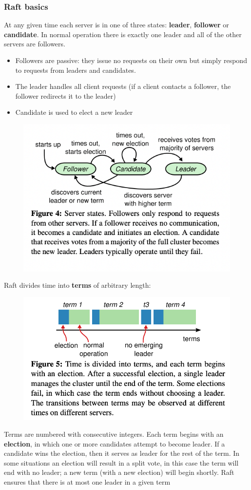 \documentclass[11pt]{article}
\begin{document}
\subsubsection{Raft basics}
\label{sec:org1157358}
At any given time each server is in one of three states: \textbf{leader}, \textbf{follower} or \textbf{candidate}. In
normal operation there is exactly one leader and all of the other servers are followers.
\begin{itemize}
\item Followers are passive: they issue no requests on their own but simply respond to requests from
leaders and candidates.
\item The leader handles all client requests (if a client contacts a follower, the follower
redirects it to the leader)
\item Candidate is used to elect a new leader
\end{itemize}
\begin{figure}[htbp]
\centering
\includegraphics[width=.7\textwidth]{../images/6.824/4.png}
\label{}
\end{figure}

Raft divides time into \textbf{terms} of arbitrary length:
\begin{figure}[htbp]
\centering
\includegraphics[width=.7\textwidth]{../images/6.824/5.png}
\label{}
\end{figure}
Terms are numbered with consecutive integers. Each term begins with an \textbf{election}, in which one or
more candidates attempt to become leader. If a candidate wins the election, then it serves as
leader for the rest of the term. In some situations an election will result in a split vote, in
this case the term will end with no leader; a new term (with a new election) will begin shortly.
Raft ensures that there is at most one leader in a given term
\end{document}
